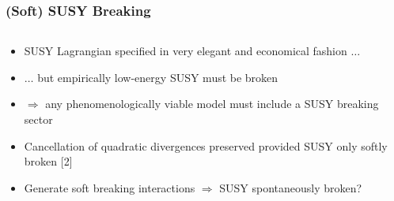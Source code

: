 \documentclass[10pt,aspectratio=169]{beamer}
\newcommand{\SUSYv}{{\cancel{SUSY}}}
\begin{document}
\begin{frame}
  \frametitle{(Soft) SUSY Breaking}
  \begin{columns}[t]
    \begin{column}{0.5\textwidth}
      \begin{itemize}\itemsep1em
      \item {\color{blue} SUSY Lagrangian specified in very elegant and
        economical fashion} $\ldots$
      \item $\ldots$ \alert{but empirically low-energy SUSY must be broken}
      \item $\Rightarrow$ any phenomenologically viable model must include a
        SUSY breaking sector
      \item Cancellation of quadratic divergences preserved
        provided SUSY only {\color{blue} softly broken} [2]
      \item Generate soft breaking interactions $\Rightarrow$
        SUSY spontaneously broken?
      \end{itemize}
    \end{column}
    \begin{column}{0.5\textwidth}
      \begin{center}
\end{center}
\end{column}
\end{columns}
\end{frame}
\end{document}
